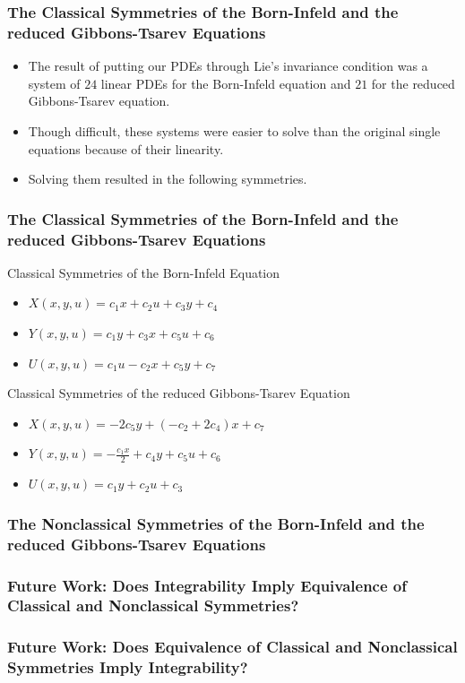 \documentclass{beamer}
\begin{document}
\begin{frame}
    \frametitle{The Classical Symmetries of the Born-Infeld and the reduced Gibbons-Tsarev Equations}
        \begin{itemize}
            \item The result of putting our PDEs through Lie's invariance condition was a system of $24$ linear PDEs for the Born-Infeld equation and $21$ for the reduced Gibbons-Tsarev equation. \pause
            \item Though difficult, these systems were easier to solve than the original single equations because of their linearity. \pause
            \item Solving them resulted in the following symmetries.
        \end{itemize}
\end{frame}


\begin{frame}
    \frametitle{The Classical Symmetries of the Born-Infeld and the reduced Gibbons-Tsarev Equations}
        \begin{large}Classical Symmetries of the Born-Infeld Equation\end{large}
        \begin{itemize}
            \item $X(x,y,u) = c_1x + c_2u + c_3y + c_4$
            \item $Y(x,y,u) = c_1y + c_3x + c_5u + c_6$
            \item $U(x,y,u) = c_1u - c_2x + c_5y + c_7$
        \end{itemize}
        \vspace*{0.25in}
        \begin{large}Classical Symmetries of the reduced Gibbons-Tsarev Equation\end{large}
        \begin{itemize}
            \item $X(x,y,u) = -2c_5y + (-c_2 + 2c_4)x + c_7$
            \item $Y(x,y,u) = -\frac{c_1x}{2} + c_4y + c_5u + c_6$
            \item $U(x,y,u) = c_1y + c_2u + c_3$	
        \end{itemize}
\end{frame}


\begin{frame}
    \frametitle{The Nonclassical Symmetries of the Born-Infeld and the reduced Gibbons-Tsarev Equations}

\end{frame}



\begin{frame}
    \frametitle{Future Work: Does Integrability Imply Equivalence of Classical and Nonclassical Symmetries?}

\end{frame}



\begin{frame}
    \frametitle{Future Work: Does Equivalence of Classical and Nonclassical Symmetries Imply Integrability?}

\end{frame}
\end{document}
